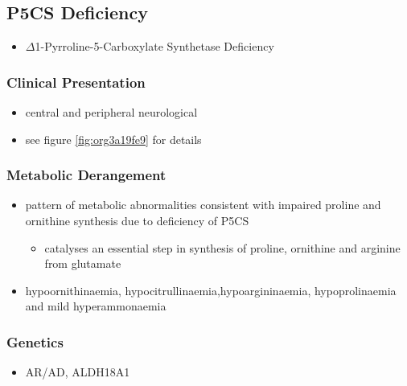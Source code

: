 \documentclass{scrartcl}
\begin{document}
\subsection{P5CS  Deficiency}
\label{sec:orgbcc64af}
\begin{itemize}
\item \(\Delta\)1-Pyrroline-5-Carboxylate Synthetase Deficiency
\end{itemize}
\subsubsection{Clinical Presentation}
\label{sec:org8ffc7ce}
\begin{itemize}
\item central and peripheral neurological
\item see figure \ref{fig:org3a19fe9} for details
\end{itemize}

\subsubsection{Metabolic Derangement}
\label{sec:org45887d0}
\begin{itemize}
\item pattern of metabolic abnormalities consistent with impaired proline
and ornithine synthesis due to deficiency of P5CS
\begin{itemize}
\item catalyses an essential step in synthesis of proline, ornithine and
arginine from glutamate
\end{itemize}
\item hypoornithinaemia, hypocitrullinaemia,hypoargininaemia,
hypoprolinaemia and mild hyperammonaemia
\end{itemize}

\subsubsection{Genetics}
\label{sec:orgdfd77ac}
\begin{itemize}
\item AR/AD, ALDH18A1
\end{itemize}
\end{document}
